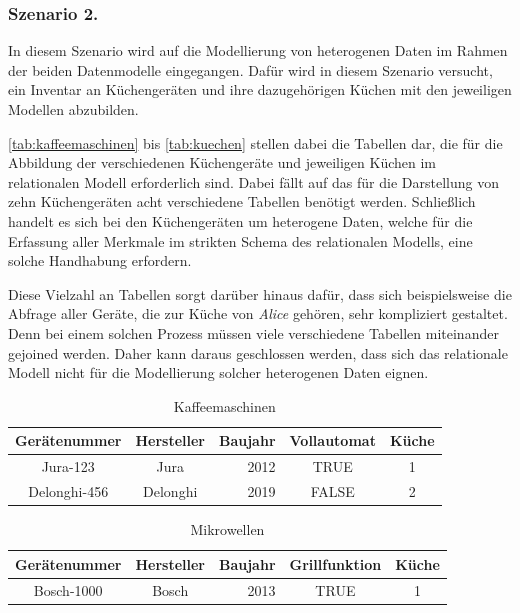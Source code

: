 \subsubsection{Szenario 2.}
In diesem Szenario wird auf die Modellierung von heterogenen Daten im Rahmen der beiden Datenmodelle eingegangen. Dafür wird in diesem Szenario versucht, ein Inventar an Küchengeräten und ihre dazugehörigen Küchen mit den jeweiligen Modellen abzubilden. 

\autoref{tab:kaffeemaschinen} bis \autoref{tab:kuechen} stellen dabei die Tabellen dar, die für die Abbildung der verschiedenen Küchengeräte und jeweiligen Küchen im relationalen Modell erforderlich sind. Dabei fällt auf das für die Darstellung von zehn Küchengeräten acht verschiedene Tabellen benötigt werden. Schließlich handelt es sich bei den Küchengeräten um heterogene Daten, welche für die Erfassung aller Merkmale im strikten Schema des relationalen Modells, eine solche Handhabung erfordern. 

Diese Vielzahl an Tabellen sorgt darüber hinaus dafür, dass sich beispielsweise die Abfrage aller Geräte, die zur Küche von \textit{Alice} gehören, sehr kompliziert gestaltet. Denn bei einem solchen Prozess müssen viele verschiedene Tabellen miteinander gejoined werden. Daher kann daraus geschlossen werden, dass sich das relationale Modell nicht für die Modellierung solcher heterogenen Daten eignen.

\begin{table}[!h]
    \centering
    \begin{tabular}{c|c|r|c|c}
    \hline
    \rowcolor[HTML]{EFEFEF} 
    \textbf{Gerätenummer} & \textbf{Hersteller} & \multicolumn{1}{c|}{\cellcolor[HTML]{EFEFEF}\textbf{Baujahr}} & \textbf{Vollautomat} & \textbf{Küche} \\ \hline
    Jura-123 & Jura & 2012 & TRUE & 1 \\
    Delonghi-456 & Delonghi & 2019 & FALSE & 2 \\ \hline
    \end{tabular}
    \caption{Kaffeemaschinen}
    \label{tab:kaffeemaschinen}
\end{table}

\begin{table}[!h]
    \centering
    \begin{tabular}{c|c|c|c|c}
    \hline
    \rowcolor[HTML]{EFEFEF} 
    \textbf{Gerätenummer} & \textbf{Hersteller} & \textbf{Baujahr} & \textbf{Grillfunktion} & \textbf{Küche} \\ \hline
    Bosch-1000 & Bosch & \multicolumn{1}{r|}{2013} & TRUE & 1 \\ \hline
    \end{tabular}
    \caption{Mikrowellen}
    \label{tab:mikrowellen}
\end{table}

